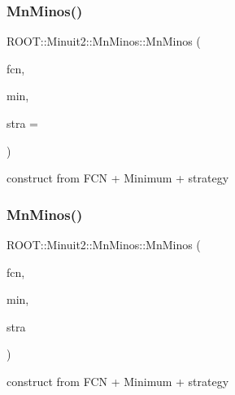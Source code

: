 \subsubsection{\texorpdfstring{MnMinos()}{MnMinos()}\hspace{0.1cm}{\footnotesize\ttfamily [5/6]}}
{\footnotesize\ttfamily R\+O\+O\+T\+::\+Minuit2\+::\+Mn\+Minos\+::\+Mn\+Minos (\begin{DoxyParamCaption}\item[{const \mbox{\hyperlink{classROOT_1_1Minuit2_1_1FCNBase}{F\+C\+N\+Base}} \&}]{fcn,  }\item[{const \mbox{\hyperlink{classROOT_1_1Minuit2_1_1FunctionMinimum}{Function\+Minimum}} \&}]{min,  }\item[{unsigned int}]{stra = {} }\end{DoxyParamCaption})}



construct from F\+CN + Minimum + strategy 

\mbox{\label{classROOT_1_1Minuit2_1_1MnMinos_a80f912ade0dd48d937bc04b14e28623c}} 
\subsubsection{\texorpdfstring{MnMinos()}{MnMinos()}\hspace{0.1cm}{\footnotesize\ttfamily [6/6]}}
{\footnotesize\ttfamily R\+O\+O\+T\+::\+Minuit2\+::\+Mn\+Minos\+::\+Mn\+Minos (\begin{DoxyParamCaption}\item[{const \mbox{\hyperlink{classROOT_1_1Minuit2_1_1FCNBase}{F\+C\+N\+Base}} \&}]{fcn,  }\item[{const \mbox{\hyperlink{classROOT_1_1Minuit2_1_1FunctionMinimum}{Function\+Minimum}} \&}]{min,  }\item[{const \mbox{\hyperlink{classROOT_1_1Minuit2_1_1MnStrategy}{Mn\+Strategy}} \&}]{stra }\end{DoxyParamCaption})}



construct from F\+CN + Minimum + strategy 

\mbox{\label{classROOT_1_1Minuit2_1_1MnMinos_a64625d0dd4308a7c8fb8930c980f11bd}} 
